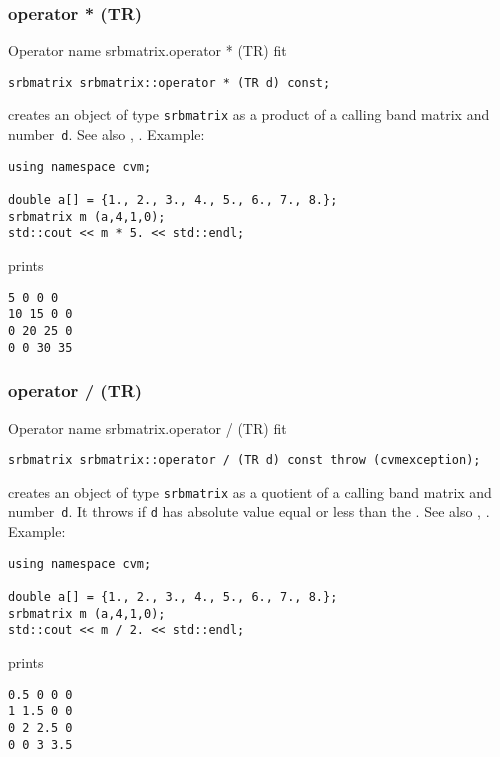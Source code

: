 \subsubsection{operator * (TR)}
Operator%
\pdfdest name {srbmatrix.operator * (TR)} fit
\begin{verbatim}
srbmatrix srbmatrix::operator * (TR d) const;
\end{verbatim}
creates an object of type \verb"srbmatrix" as a product of
a calling band matrix and  number~\verb"d".
See also ,
.
Example:
\begin{Verbatim}
using namespace cvm;

double a[] = {1., 2., 3., 4., 5., 6., 7., 8.};
srbmatrix m (a,4,1,0);
std::cout << m * 5. << std::endl;
\end{Verbatim}
prints
\begin{Verbatim}
5 0 0 0
10 15 0 0
0 20 25 0
0 0 30 35
\end{Verbatim}
\newpage



\subsubsection{operator / (TR)}
Operator%
\pdfdest name {srbmatrix.operator / (TR)} fit
\begin{verbatim}
srbmatrix srbmatrix::operator / (TR d) const throw (cvmexception);
\end{verbatim}
creates an object of type \verb"srbmatrix" as a quotient of
a calling band matrix and  number~\verb"d". It throws
if \verb"d" has  absolute value equal or less than the
.
See also ,
.
Example:
\begin{Verbatim}
using namespace cvm;

double a[] = {1., 2., 3., 4., 5., 6., 7., 8.};
srbmatrix m (a,4,1,0);
std::cout << m / 2. << std::endl;
\end{Verbatim}
prints
\begin{Verbatim}
0.5 0 0 0
1 1.5 0 0
0 2 2.5 0
0 0 3 3.5
\end{Verbatim}
\newpage



